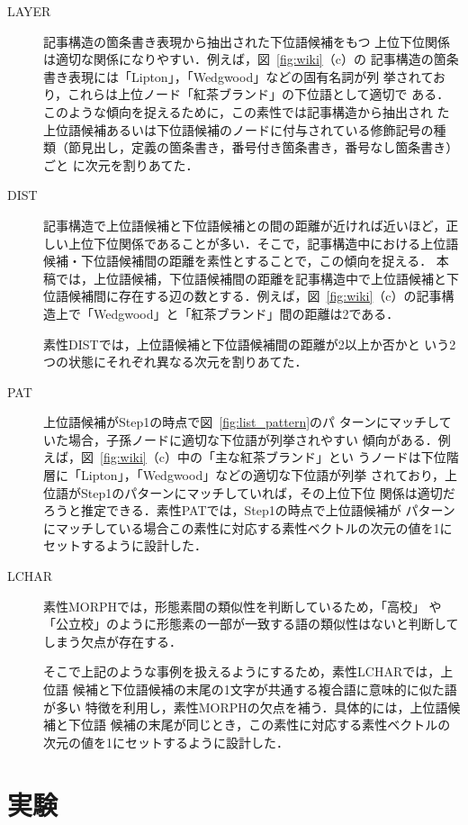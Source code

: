 \documentclass[japanese]{jnlp_1.4}
\begin{document}
\begin{description}
     \item[LAYER] 記事構造の箇条書き表現から抽出された下位語候補をもつ
   上位下位関係は適切な関係になりやすい．例えば，図~\ref{fig:wiki}（c）の
   記事構造の箇条書き表現には「Lipton」，「Wedgwood」などの固有名詞が列
   挙されており，これらは上位ノード「紅茶ブランド」の下位語として適切で
   ある．このような傾向を捉えるために，この素性では記事構造から抽出され
   た上位語候補あるいは下位語候補のノードに付与されている修飾記号の種
   類（節見出し，定義の箇条書き，番号付き箇条書き，番号なし箇条書き）ごと
   に次元を割りあてた．
     \item[DIST] 記事構造で上位語候補と下位語候補との間の距離が近ければ近いほど，正
   しい上位下位関係であることが多い．そこで，記事構造中における上位語
   候補・下位語候補間の距離を素性とすることで，この傾向を捉える．
   本稿では，上位語候補，下位語候補間の距離を記事構造中で上位語候補と下
   位語候補間に存在する辺の数とする．例えば，図~\ref{fig:wiki}（c）の記事構
   造上で「Wedgwood」と「紅茶ブランド」間の距離は2である．
   
   素性DISTでは，上位語候補と下位語候補間の距離が2以上か否かと
   いう2つの状態にそれぞれ異なる次元を割りあてた．
   
     \item[PAT] 上位語候補がStep1の時点で図~\ref{fig:list_pattern}のパ
   ターンにマッチしていた場合，子孫ノードに適切な下位語が列挙されやすい
   傾向がある．例えば，図~\ref{fig:wiki}（c）中の「主な紅茶ブランド」とい
   うノードは下位階層に「Lipton」，「Wedgwood」などの適切な下位語が列挙
   されており，上位語がStep1のパターンにマッチしていれば，その上位下位
   関係は適切だろうと推定できる．素性PATでは，Step1の時点で上位語候補が
   パターンにマッチしている場合{この素性に対応する素性ベクトルの次元の値を1にセットするように設計した}．

     \item[LCHAR] 素性MORPHでは，形態素間の類似性を判断しているため，「高校」
   や「公立校」のように形態素の一部が一致する語の類似性はないと判断してしまう欠点が存在する．
   
   そこで上記のような事例を扱えるようにするため，素性LCHARでは，上位語
   候補と下位語候補の末尾の1文字が共通する複合語に意味的に似た語が多い
   特徴を利用し，素性MORPHの欠点を補う．具体的には，上位語候補と下位語
   候補の末尾が同じとき，{この素性に対応する素性ベクトルの次元の値を1にセットするように設計した}．

\end{description}


\section{実験}\label{sec:exp}
\end{document}
